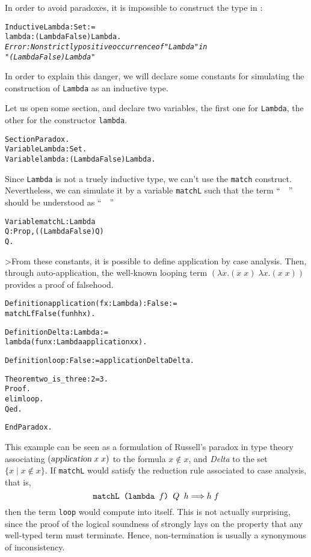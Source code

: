 \documentclass[11pt]{article}
\begin{document}
In order to avoid paradoxes, it is impossible to construct
the type  in {\coq}:

\begin{alltt}
Inductive Lambda : Set :=
  lambda : (Lambda {\arrow} False) {\arrow} Lambda.
\it
Error: Non strictly positive occurrence of "Lambda" in
 "(Lambda {\arrow} False) {\arrow} Lambda"
\end{alltt}

In order to explain this danger, we
will declare some constants for simulating the construction of
\texttt{Lambda} as an inductive type.

Let us open some section, and declare two variables, the first one for
\texttt{Lambda}, the other for the constructor \texttt{lambda}.

\begin{alltt}
Section Paradox.
Variable Lambda : Set.
Variable lambda : (Lambda {\arrow} False) {\arrow}Lambda.
\end{alltt}

Since \texttt{Lambda} is not a truely inductive type, we can't use
the \texttt{match} construct. Nevertheless, we can simulate it by a
variable \texttt{matchL} such that the term
``~~''
should be understood  as
``~~''


\begin{alltt}
Variable matchL : Lambda {\arrow}
                  {\prodsym} Q:Prop, ((Lambda {\arrow}False) {\arrow} Q) {\arrow}
                  Q.
\end{alltt}

>From these constants, it is possible to define application by case
analysis. Then, through auto-application, the well-known looping term
$(\lambda x.(x\;x)\;\lambda x.(x\;x))$ provides a proof of falsehood.

\begin{alltt}
Definition application (f x: Lambda) :False :=
  matchL f False (fun h {\funarrow} h x).

Definition Delta :  Lambda :=
  lambda (fun x : Lambda {\funarrow} application x x).

Definition loop : False := application Delta Delta.

Theorem two_is_three : 2 = 3.
Proof.
 elim loop.
Qed.

End Paradox.
\end{alltt}

\noindent This example can be seen as a formulation of Russell's
paradox in type theory associating $(\textsl{application}\;x\;x)$ to the
formula $x\not\in x$, and \textsl{Delta} to the set $\{ x \mid
x\not\in x\}$. If \texttt{matchL} would satisfy the reduction rule
associated to case analysis, that is,
$$ \mbox{\texttt{matchL (lambda $f$) $Q$ $h$}} \Longrightarrow h\;f$$
then the term \texttt{loop}
would compute into itself.  This is not actually surprising, since the
proof of the logical soundness of {\coq} strongly lays on the property
that any well-typed term must terminate. Hence, non-termination is
usually a synonymous of inconsistency.
\end{document}

